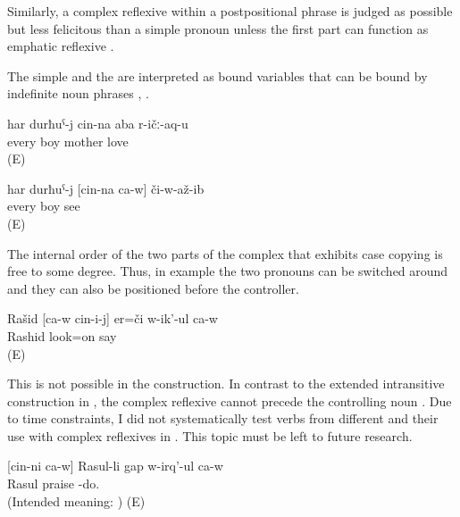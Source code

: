 Similarly, a complex reflexive within a postpositional phrase is judged as possible but less felicitous than a simple pronoun unless the first part can function as emphatic reflexive .

The simple and the  are interpreted as bound variables that can be bound by indefinite noun phrases , .
%
\begin{exe}
	\ex	\label{ex:Every boy loves his mother}
	\gll	har	durħuˁ-j	cin-na	aba	r-ičː-aq-u\\
		every	boy		mother	love\\
	\glt	{} (E)

	\ex	\label{ex:Every boy saw himself@25}
	\gll	har	durħuˁ-j	[cin-na	ca-w]	či-w-až-ib\\
		every	boy			see\\
	\glt	{} (E)
\end{exe}


The internal order of the two parts of the complex  that exhibits case copying is free to some degree. Thus, in example  the two pronouns can be switched around and they can also be positioned before the controller.
%
\begin{exe}
	\ex	\label{ex:Rashid is looking at himself}
	\begin{xlist}
		\ex	\label{ex:Rashid is looking at himself@A}
		\gll	Rašid	[ca-w	cin-i-j]	er=či	w-ik'-ul	ca-w\\
			Rashid			look=on	say	\\
		\glt	{} (E)

		\ex	{}	\label{ex:Rashid is looking at himself@B}

		\ex	{}	\label{ex:Rashid is looking at himself@C}
	\end{xlist}
\end{exe}

This is not possible in the  construction. In contrast to the extended intransitive construction in , the complex reflexive cannot precede the controlling noun . Due to time constraints, I did not systematically test verbs from different  and their use with complex reflexives in . This topic must be left to future research. 
%
\begin{exe} 
	\ex	\label{ex:himself Rashid is praising ungrammatical@29a}
	\gll {*} [cin-ni ca-w] Rasul-li gap w-irq'-ul ca-w	\\
	{}	 	Rasul		praise -do.	\\
	\glt	(Intended meaning: ) (E)
\end{exe}

